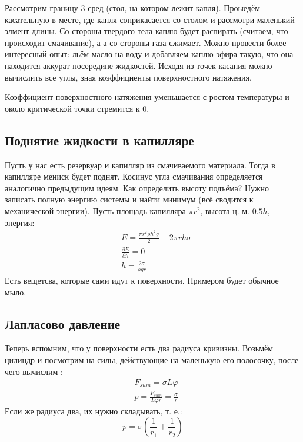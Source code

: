 \documentclass[a4paper, 12pt]{article}
\renewcommand{\phi}{\varphi} %
\begin{document}
	Рассмотрим границу 3 сред (стол, на котором лежит капля). Проыедём касательную в месте, где капля соприкасается со столом и рассмотри маленький элмент длины. Со стороны твердого тела каплю будет распирать (считаем, что происходит смачивание), а а со стороны газа сжимает. Можно провести более интересный опыт: льём масло на воду и добавляем каплю эфира такую, что она находится аккурат посередине жидкостей. Исходя из точек касания можно вычислить все углы, зная коэффициенты поверхностного натяжения. 
	
	Коэффициент поверхностного натяжения уменьшается с ростом температуры и около критической точки стремится к 0.
	\subsection{Поднятие жидкости в капилляре}
	Пусть у нас есть резервуар и капилляр из смачиваемого материала. Тогда в капилляре мениск будет поднят. Косинус угла смачивания определяется аналогично предыдущим идеям. Как определить высоту подъёма? Нужно записать полную энергию системы и найти минимум (всё сводится к механической энергии). Пусть площадь капилляра $\pi r^{2}$, высота ц. м. $0.5h$, энергия:
	\begin{equation*}
		\begin{aligned}
			& E = \frac{ \pi r^{2} \rho h^{2} g}{2} - 2 \pi r h \sigma \\
			& \frac{\partial E}{\partial h} = 0                        \\
			& h =\frac {2 \sigma}{\rho g r}                            
		\end{aligned}
	\end{equation*}
	Есть вещетсва, которые сами идут к поверхности. Примером будет обычное мыло. 
	\subsection{Лапласово давление}
	Теперь вспомним, что у поверхности есть два радиуса кривизны. Возьмём цилиндр и посмотрим на силы, действующие на маленькую его полосочку, после чего вычислим :
	\begin{equation*}
		\begin{aligned}
			& F_{sum} = \sigma L \phi                           \\
			& p =\frac{ F_{sum} }{ L \phi r} = \frac{\sigma}{r} 
		\end{aligned}
	\end{equation*}
	Если же радиуса два, их нужно складывать, т. е.:
	\begin{equation*}
		p =\sigma( \frac{1}{r_{1}}+ \frac{1}{r_{2}})
	\end{equation*}
\end{document}
